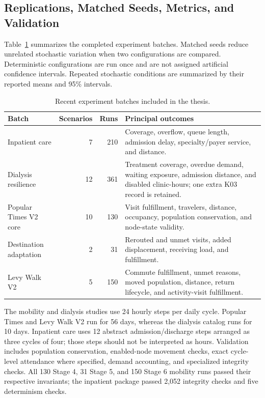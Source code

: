 \documentclass[pdflatex,sn-mathphys-num]{sn-jnl}%
\theoremstyle{thmstyleone}%
\theoremstyle{thmstyletwo}%
\theoremstyle{thmstylethree}%
\begin{document}
\subsection{Replications, Matched Seeds, Metrics, and Validation}

Table~\ref{tbl:extended_batches} summarizes the completed experiment batches. Matched seeds reduce unrelated stochastic variation when two configurations are compared. Deterministic configurations are run once and are not assigned artificial confidence intervals. Repeated stochastic conditions are summarized by their reported means and 95\% intervals.

\begin{table}[ht]
\centering
\footnotesize
\caption{Recent experiment batches included in the thesis.}
\label{tbl:extended_batches}
\begin{tabularx}{\linewidth}{@{}lrrX@{}}
\toprule
\textbf{Batch} & \textbf{Scenarios} & \textbf{Runs} & \textbf{Principal outcomes} \\ \midrule
Inpatient care & 7 & 210 & Coverage, overflow, queue length, admission delay, specialty/payer service, and distance. \\ \midrule
Dialysis resilience & 12 & 361 & Treatment coverage, overdue demand, waiting exposure, admission distance, and disabled clinic-hours; one extra K03 record is retained. \\ \midrule
Popular Times V2 core & 10 & 130 & Visit fulfillment, travelers, distance, occupancy, population conservation, and node-state validity. \\ \midrule
Destination adaptation & 2 & 31 & Rerouted and unmet visits, added displacement, receiving load, and fulfillment. \\ \midrule
Levy Walk V2 & 5 & 150 & Commute fulfillment, unmet reasons, moved population, distance, return lifecycle, and activity-visit fulfillment. \\ \bottomrule
\end{tabularx}
\end{table}

The mobility and dialysis studies use 24 hourly steps per daily cycle. Popular Times and Levy Walk V2 run for 56 days, whereas the dialysis catalog runs for 10 days. Inpatient care uses 12 abstract admission/discharge steps arranged as three cycles of four; those steps should not be interpreted as hours. Validation includes population conservation, enabled-node movement checks, exact cycle-level attendance where specified, demand accounting, and specialized integrity checks. All 130 Stage 4, 31 Stage 5, and 150 Stage 6 mobility runs passed their respective invariants; the inpatient package passed 2,052 integrity checks and five determinism checks.
\end{document}
